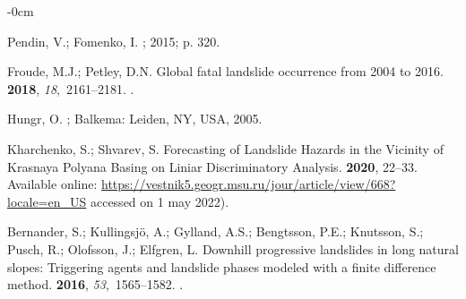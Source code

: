 \documentclass[mathematics,article,accept,pdftex,moreauthors]{Definitions/mdpi}
\begin{document}
\begin{adjustwidth}{-\extralength}{0cm}



%
\begin{thebibliography}{999}

Pendin, V.; Fomenko, I.
;  2015; 
  p. 320. 

Froude, M.J.; Petley, D.N.
\newblock Global fatal landslide occurrence from 2004 to 2016.
 {\bf 2018}, {\em
  18},~2161--2181.
.

Hungr, O.
; Balkema: Leiden, NY, USA,  2005.

Kharchenko, S.; Shvarev, S.
\newblock Forecasting of Landslide Hazards in the Vicinity of Krasnaya Polyana
  Basing on Liniar Discriminatory Analysis.
 {\bf 2020},  22--33.
\newblock
  Available online:  \url{https://vestnik5.geogr.msu.ru/jour/article/view/668?locale=en_US}  accessed on 1 may 2022).

Bernander, S.; Kullingsj\"{o}, A.; Gylland, A.S.; Bengtsson, P.E.; Knutsson,
  S.; Pusch, R.; Olofsson, J.; Elfgren, L.
\newblock Downhill progressive landslides in long natural slopes: Triggering
  agents and landslide phases modeled with a finite difference method.
 {\bf 2016}, {\em 53},~1565--1582.
.


\end{thebibliography}
\end{adjustwidth}
\end{document}
